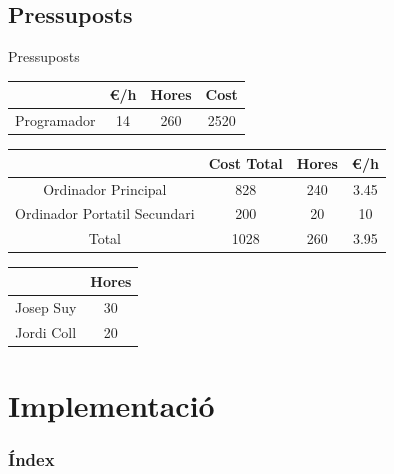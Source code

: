 \documentclass[11pt]{beamer}
\begin{document}
  \subsection{Pressuposts}
  \begin{frame}{Pressuposts}
    \begin{center}
      \begin{tabular}{|| c | c | c | c||} 
      \hline
       & \euro/h & Hores & Cost \\ [0.5ex] 
      \hline\hline
      Programador & 14 & 260 & 2520 \\ [1ex] 
      \hline
     \end{tabular}
     \end{center}
  
     \begin{center}
      \begin{tabular}{|| c | c | c | c||} 
      \hline
       & Cost Total & Hores & \euro/h \\ [0.5ex] 
      \hline\hline
      Ordinador Principal & 828 & 240 & 3.45 \\ [1ex] 
      Ordinador Portatil Secundari & 200 & 20 & 10 \\ [1ex] 
      \hline\hline
      Total & 1028 & 260 & 3.95 \\
      \hline
     \end{tabular}
     \end{center}
  
     \begin{center}
      \begin{tabular}{|| c | c ||} 
      \hline
       & Hores \\ [0.5ex] 
      \hline\hline
      Josep Suy & 30 \\ [1ex] 
      Jordi Coll & 20 \\ [1ex] 
      \hline
     \end{tabular}
     \end{center}
  \end{frame}

  \section{Implementació}
  \begin{frame}
    \frametitle{Índex}
    \tableofcontents[currentsection]
  \end{frame}
  
\end{document}

